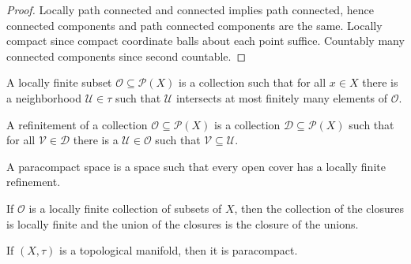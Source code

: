 \documentclass{article}                                                        %
\begin{document}
        \begin{proof}
            Locally path connected and connected implies path connected, hence
            connected components and path connected components are the same.
            Locally compact since compact coordinate balls about each point
            suffice. Countably many connected components since second countable.
        \end{proof}
        \begin{definition}
            A locally finite subset $\mathcal{O}\subseteq\mathcal{P}(X)$ is a
            collection such that for all $x\in{X}$ there is a neighborhood
            $\mathcal{U}\in\tau$ such that $\mathcal{U}$ intersects at most
            finitely many elements of $\mathcal{O}$.
        \end{definition}
        \begin{definition}
            A refinitement of a collection $\mathcal{O}\subseteq\mathcal{P}(X)$
            is a collection $\mathcal{D}\subseteq\mathcal{P}(X)$ such that for
            all $\mathcal{V}\in\mathcal{D}$ there is a
            $\mathcal{U}\in\mathcal{O}$ such that
            $\mathcal{V}\subseteq\mathcal{U}$.
        \end{definition}
        \begin{definition}
            A paracompact space is a space such that every open cover has a
            locally finite refinement.
        \end{definition}
        \begin{theorem}
            If $\mathcal{O}$ is a locally finite collection of subsets of $X$,
            then the collection of the closures is locally finite and the union
            of the closures is the closure of the unions.
        \end{theorem}
        \begin{theorem}
            If $(X,\tau)$ is a topological manifold, then it is paracompact.
        \end{theorem}
\end{document}
